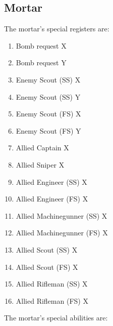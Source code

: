 \documentclass{article}
\begin{document}
\subsection*{Mortar}

The mortar's special registers are:

\begin{enumerate}[noitemsep]
    \item Bomb request X
    \item Bomb request Y
    \item Enemy Scout (SS) X
    \item Enemy Scout (SS) Y
    \item Enemy Scout (FS) X
    \item Enemy Scout (FS) Y
    \item Allied Captain X
    \item Allied Sniper X
    \item Allied Engineer (SS) X
    \item Allied Engineer (FS) X
    \item Allied Machinegunner (SS) X
    \item Allied Machinegunner (FS) X
    \item Allied Scout (SS) X
    \item Allied Scout (FS) X
    \item Allied Rifleman (SS) X
    \item Allied Rifleman (FS) X
\end{enumerate}

The mortar's special abilities are:
\end{document}
